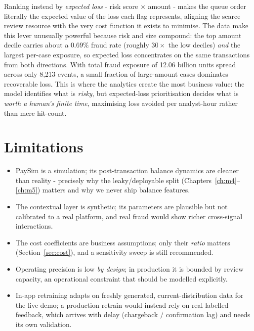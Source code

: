 \documentclass[11pt,a4paper]{report}
\begin{document}
Ranking instead by \emph{expected loss} - risk score $\times$ amount - makes the queue order literally the expected value of the loss each flag represents, aligning the scarce review resource with the very cost function it exists to minimise. The data make this lever unusually powerful because risk and size compound: the top amount decile carries about a 0.69\% fraud rate (roughly $30\times$ the low deciles) \emph{and} the largest per-case exposure, so expected loss concentrates on the same transactions from both directions. With total fraud exposure of 12.06 billion units spread across only 8{,}213 events, a small fraction of large-amount cases dominates recoverable loss. This is where the analytics create the most business value: the model identifies what is \emph{risky}, but expected-loss prioritisation decides what is \emph{worth a human's finite time}, maximising loss avoided per analyst-hour rather than mere hit-count.

\section{Limitations}

\begin{itemize}[nosep,leftmargin=1.4em]
  \item PaySim is a simulation; its post-transaction balance dynamics are cleaner than
        reality - precisely why the leaky/deployable split (Chapters~\ref{ch:m4}--\ref{ch:m5})
        matters and why we never ship balance features.
  \item The contextual layer is synthetic; its parameters are plausible but not calibrated to
        a real platform, and real fraud would show richer cross-signal interactions.
  \item The cost coefficients are business assumptions; only their \emph{ratio} matters
        (Section~\ref{sec:cost}), and a sensitivity sweep is still recommended.
  \item Operating precision is low \emph{by design}; in production it is bounded by review
        capacity, an operational constraint that should be modelled explicitly.
  \item In-app retraining adapts on freshly generated, current-distribution data for the
        live demo; a production retrain would instead rely on real labelled feedback, which
        arrives with delay (chargeback / confirmation lag) and needs its own validation.
\end{itemize}
\end{document}
